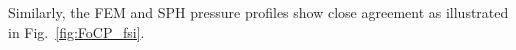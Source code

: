 Similarly, the FEM and SPH pressure profiles show close agreement as illustrated in Fig.~\ref{fig:FoCP_fsi}.
